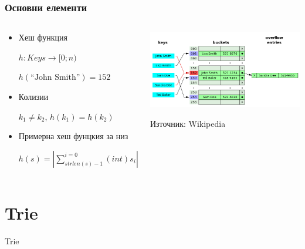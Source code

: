 \documentclass{beamer}
\begin{document}
\begin{frame}[fragile]
\frametitle{Основни елементи}


\begin{columns}[t]
  \begin{column}{0.4\textwidth}

\begin{itemize}
  \item Хеш функция

  $h:Keys \rightarrow [0;n)$

  $h(\text{``John Smith''})=152$

  \item Колизии
  
  $k_1 \neq k_2$, $h(k_1)=h(k_2)$

  \item {Примерна хеш фунцкия за низ}

  $h(s)=|\sum\limits^{i=0}_{strlen(s)-1}(int)s_i|_n$
\end{itemize}

  \end{column}
  \begin{column}{0.6\textwidth}

\begin{center}
\includegraphics[width=7cm]{images/hast1}  
\end{center}
\begin{center}
Източник: Wikipedia
\end{center}

  \end{column}
\end{columns}
\end{frame}

\section{Trie}


\begin{frame}
\centerline{Trie}
\end{frame}
\end{document}
